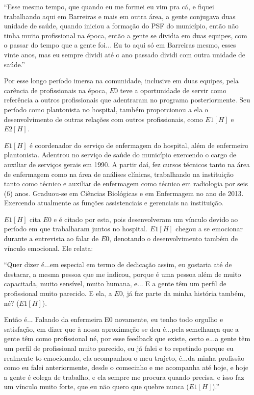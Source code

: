 \begin{citacao}
``Esse mesmo tempo, que quando eu me formei eu vim pra cá, e fiquei trabalhando aqui em Barreiras e mais em outra área, a gente conjugava duas unidade de saúde, quando iniciou a formação do PSF do município, então não tinha muito profissional na época, então a gente se dividia em duas equipes, com o passar do tempo que a gente foi... Eu to aqui só em Barreiras mesmo, esses vinte anos, mas eu sempre dividi até o ano passado dividi com outra unidade de saúde.''
\end{citacao}

Por esse longo período imersa na comunidade, inclusive em duas equipes, pela carência de profissionais na época, $E0$ teve a oportunidade de servir como referência a outros profissionais que adentraram no programa posteriormente. Seu período como plantonista no hospital, também proporcionou a ela o desenvolvimento de outras relações com outros profissionais, como $E1 [H]$ e $E2 [H]$.

$E1[H]$ é coordenador do serviço de enfermagem do hospital, além de enfermeiro plantonista. Adentrou no serviço de saúde do município exercendo o cargo de auxiliar de serviços gerais em 1990. A partir daí, fez cursos técnicos tanto na área de enfermagem como na área de análises clínicas, trabalhando na instituição tanto como técnico e auxiliar de enfermagem como técnico em radiologia por seis (6) anos. Graduou-se em Ciências Biológicas e em Enfermagem no ano de 2013. Exercendo atualmente as funções assistenciais e gerenciais na instituição.

$E1[H]$ cita $E0$ e é citado por esta, pois desenvolveram um vínculo devido ao período em que trabalharam juntos no hospital. $E1[H]$ chegou a se emocionar durante a entrevista ao falar de $E0$, denotando o desenvolvimento também de vínculo emocional. Ele relata:

\begin{citacao}
``Quer dizer é...em especial em termo de dedicação assim, eu gostaria até de destacar, a mesma pessoa que me indicou, porque é uma pessoa além de muito capacitada, muito sensível, muito humana, e... E a gente têm um perfil de profissional muito parecido. E ela, a $E0$, já faz parte da minha história também, né? ($E1[H]$).

Então é... Falando da enfermeira E0 novamente, eu tenho todo orgulho e satisfação, em dizer que à nossa aproximação se deu é...pela semelhança que a gente têm como profissional né, por esse feedback que existe, certo e...a gente têm um perfil de profissional muito parecido, eu já falei e to repetindo porque eu realmente to emocionado, ela acompanhou o meu trajeto, é...da minha profissão como eu falei anteriormente, desde o comecinho e me acompanha até hoje, e hoje a gente é colega de trabalho, e ela sempre me procura quando precisa, e isso faz um vínculo muito forte, que eu não quero que quebre nunca ($E1[H]$).''
\end{citacao}

